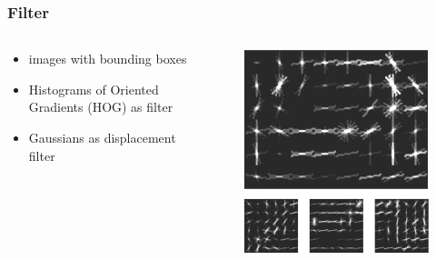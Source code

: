 \documentclass[xcolor=dvipsnames]{beamer}
\begin{document}
\begin{frame}
	\frametitle{Filter}
	\begin{columns}
		\begin{column}{0.6\textwidth}
			\begin{itemize}
				\item images with bounding boxes
				\item Histograms of Oriented Gradients (HOG) as filter
				\item Gaussians as displacement filter
			\end{itemize}
		\end{column}
		\begin{column}{0.4\textwidth}
			\begin{figure}
				\includegraphics[width=\textwidth]{img/exa.png}
			\end{figure}
		\end{column}
	\end{columns}
\end{frame}
\end{document}
